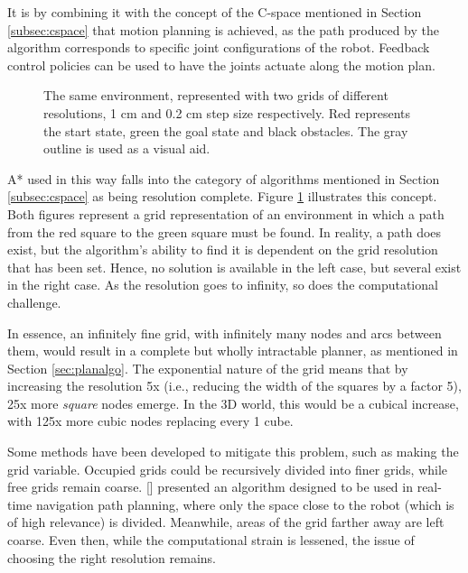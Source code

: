 It is by combining it with the concept of the C-space mentioned in Section \ref{subsec:cspace} that motion planning is achieved, as the path produced by the algorithm corresponds to specific joint configurations of the robot. Feedback control policies can be used to have the joints actuate along the motion plan.

\begin{figure}[!h]
	\begin{minipage}[t]{4 cm}
		
	\end{minipage}
	\hspace{2.5cm}
	\begin{minipage}[t]{4 cm}
		
	\end{minipage}
\caption{The same environment, represented with two grids of different resolutions, 1 cm and 0.2 cm step size respectively. Red represents the start state, green the goal state and black obstacles. The gray outline is used as a visual aid.} 
\label{fig:grids_reso_ex}
\end{figure}


A* used in this way falls into the category of algorithms mentioned in Section \ref{subsec:cspace} as being resolution complete. Figure \ref{fig:grids_reso_ex} illustrates this concept. Both figures represent a grid representation of an environment in which a path from the red square to the green square must be found. In reality, a path does exist, but the algorithm's ability to find it is dependent on the grid resolution that has been set. Hence, no solution is available in the left case, but several exist in the right case. As the resolution goes to infinity, so does the computational challenge. 

In essence, an infinitely fine grid, with infinitely many nodes and arcs between them, would result in a complete but wholly intractable planner, as mentioned in Section \ref{sec:planalgo}. The exponential nature of the grid means that by increasing the resolution 5x (i.e., reducing the width of the squares by a factor 5), 25x more \textit{square} nodes emerge. In the 3D world, this would be a cubical increase, with 125x more cubic nodes replacing every 1 cube. 

Some methods have been developed to mitigate this problem, such as making the grid variable. Occupied grids could be recursively divided into finer grids, while free grids remain coarse. [\citeauthor{Kirby2009}] presented an algorithm designed to be used in real-time navigation path planning, where only the space close to the robot (which is of high relevance) is divided. Meanwhile, areas of the grid farther away are left coarse. Even then, while the computational strain is lessened, the issue of choosing the right resolution remains.

